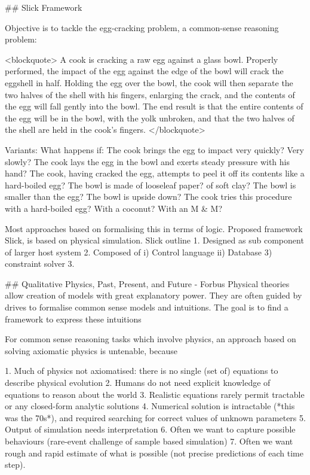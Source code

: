 \documentclass{tlp}
\begin{document}
## Slick Framework

Objective is to tackle the egg-cracking problem, a common-sense reasoning problem:

<blockquote>
A cook is cracking a raw egg against a glass bowl. Properly performed, the impact of the egg against the edge of the bowl will crack the eggshell in half. Holding the egg over the bowl, the cook will then separate the two halves of the shell with his fingers, enlarging the crack, and the contents of the egg will fall gently into the bowl. The end result is that the entire contents of the egg will be in the bowl, with the yolk unbroken, and that the two halves of the shell are held in the cook's fingers.
</blockquote>

Variants: 
What happens if: The cook brings the egg to impact very quickly? Very slowly? The cook lays the egg in the bowl and exerts steady pressure with his hand? The cook, having cracked the egg, attempts to peel it off its contents like a hard-boiled egg? The bowl is made of looseleaf paper? of soft clay? The bowl is smaller than the egg? The bowl is upside down? The cook tries this procedure with a hard-boiled egg? With a coconut? With an M & M?

Most approaches based on formalising this in terms of logic.
Proposed framework Slick, is based on physical simulation.
Slick outline
1. Designed as sub component of larger host system
2. Composed of i) Control language ii) Database 3) constraint solver
3. 

## Qualitative Physics, Past, Present, and Future - Forbus
Physical theories allow creation of models with great explanatory power.
They are often guided by drives to formalise common sense models and intuitions.
The goal is to find a framework to express these intuitions

For common sense reasoning tasks which involve physics, an approach based on solving axiomatic physics is untenable, because

1. Much of physics not axiomatised: there is no single (set of) equations to describe physical evolution
2. Humans do not need explicit knowledge of equations to reason about the world
3. Realistic equations rarely permit tractable or any closed-form analytic solutions
4. Numerical solution is intractable (*this was the 70s*), and required searching for correct values of unknown parameters
5. Output of simulation needs interpretation
6. Often we want to capture possible behaviours (rare-event challenge of sample based simulation)
7. Often we want rough and rapid estimate of what is possible (not precise predictions of each time step).
\end{document}
